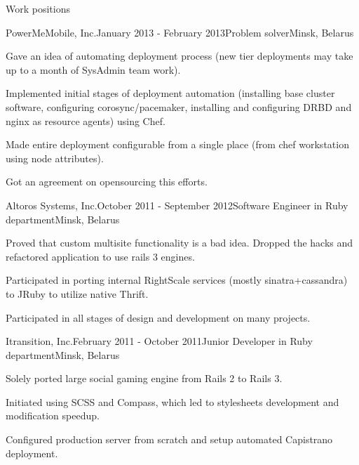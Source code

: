 \documentclass{resume} %
\begin{document}
\begin{rSection}{Work positions}
\begin{rSubsection}{PowerMeMobile, Inc.}{January 2013 - February 2013}{Problem solver}{Minsk, Belarus}
\item Gave an idea of automating deployment process (new tier deployments may take up to
  a month of SysAdmin team work).
\item Implemented initial stages of deployment automation (installing base cluster software,
  configuring corosync/pacemaker, installing and configuring DRBD and nginx as resource agents) using Chef.
\item Made entire deployment configurable from a single place (from chef workstation using node attributes).
\item Got an agreement on opensourcing this efforts.
\end{rSubsection}

\begin{rSubsection}{Altoros Systems, Inc.}{October 2011 - September 2012}{Software Engineer in Ruby department}{Minsk, Belarus}
\item Proved that custom multisite functionality is a bad idea. Dropped the hacks and refactored application to use rails 3 engines.
\item Participated in porting internal RightScale services (mostly sinatra+cassandra) to JRuby to utilize native Thrift.
\item Participated in all stages of design and development on many projects.
\end{rSubsection}

\begin{rSubsection}{Itransition, Inc.}{February 2011 - October 2011}{Junior Developer in Ruby department}{Minsk, Belarus}
\item Solely ported large social gaming engine from Rails 2 to Rails 3.
\item Initiated using SCSS and Compass, which led to stylesheets development and modification speedup.
\item Configured production server from scratch and setup automated Capistrano deployment.
\end{rSubsection}

\end{rSection}

\end{document}
